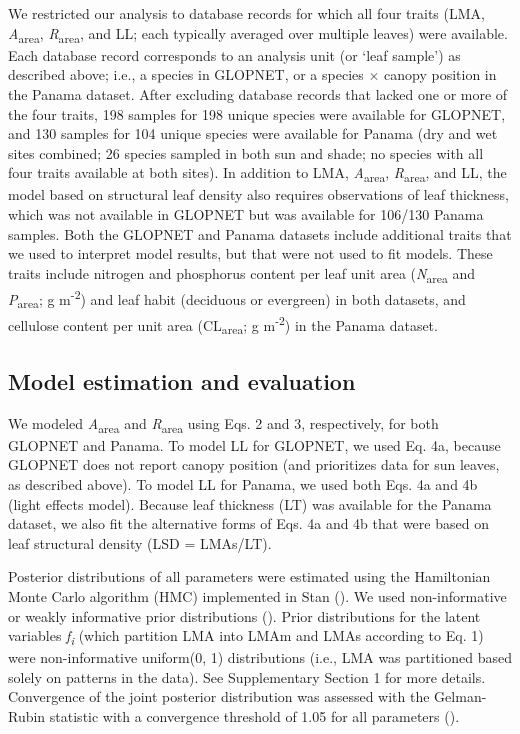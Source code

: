 \documentclass[
  12pt,
  letterpaper,
  DIV=11,
  numbers=noendperiod]{scrartcl}
\begin{document}
We restricted our analysis to database records for which all four traits
(LMA, \emph{A}\textsubscript{area}, \emph{R}\textsubscript{area}, and
LL; each typically averaged over multiple leaves) were available. Each
database record corresponds to an analysis unit (or `leaf sample') as
described above; i.e., a species in GLOPNET, or a species \(\times\)
canopy position in the Panama dataset. After excluding database records
that lacked one or more of the four traits, 198 samples for 198 unique
species were available for GLOPNET, and 130 samples for 104 unique
species were available for Panama (dry and wet sites combined; 26
species sampled in both sun and shade; no species with all four traits
available at both sites). In addition to LMA,
\emph{A}\textsubscript{area}, \emph{R}\textsubscript{area}, and LL, the
model based on structural leaf density also requires observations of
leaf thickness, which was not available in GLOPNET but was available for
106/130 Panama samples. Both the GLOPNET and Panama datasets include
additional traits that we used to interpret model results, but that were
not used to fit models. These traits include nitrogen and phosphorus
content per leaf unit area (\emph{N}\textsubscript{area} and
\emph{P}\textsubscript{area}; g m\textsuperscript{-2}) and leaf habit
(deciduous or evergreen) in both datasets, and cellulose content per
unit area (CL\textsubscript{area}; g m\textsuperscript{-2}) in the
Panama dataset.

\subsection{Model estimation and
evaluation}\label{model-estimation-and-evaluation}

We modeled \emph{A}\textsubscript{area} and \emph{R}\textsubscript{area}
using Eqs. 2 and 3, respectively, for both GLOPNET and Panama. To model
LL for GLOPNET, we used Eq. 4a, because GLOPNET does not report canopy
position (and prioritizes data for sun leaves, as described above). To
model LL for Panama, we used both Eqs. 4a and 4b (light effects model).
Because leaf thickness (LT) was available for the Panama dataset, we
also fit the alternative forms of Eqs. 4a and 4b that were based on leaf
structural density (LSD = LMAs/LT).

Posterior distributions of all parameters were estimated using the
Hamiltonian Monte Carlo algorithm (HMC) implemented in Stan
(). We used
non-informative or weakly informative prior distributions
(). Prior distributions for the
latent variables \emph{f\textsubscript{i}} (which partition LMA into
LMAm and LMAs according to Eq. 1) were non-informative uniform(0, 1)
distributions (i.e., LMA was partitioned based solely on patterns in the
data). See Supplementary Section 1 for more details. Convergence of the
joint posterior distribution was assessed with the Gelman-Rubin
statistic with a convergence threshold of 1.05 for all parameters
().
\end{document}
